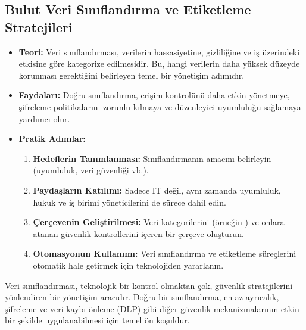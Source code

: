\subsection{Bulut Veri Sınıflandırma ve Etiketleme Stratejileri}
\begin{itemize}
    \item \textbf{Teori:} Veri sınıflandırması, verilerin hassasiyetine, gizliliğine ve iş üzerindeki etkisine göre kategorize edilmesidir. Bu, hangi verilerin daha yüksek düzeyde korunması gerektiğini belirleyen temel bir yönetişim adımıdır.
    \item \textbf{Faydaları:} Doğru sınıflandırma, erişim kontrolünü daha etkin yönetmeye, şifreleme politikalarını zorunlu kılmaya ve düzenleyici uyumluluğu sağlamaya yardımcı olur.
    \item \textbf{Pratik Adımlar:}
    \begin{enumerate}
        \item \textbf{Hedeflerin Tanımlanması:} Sınıflandırmanın amacını belirleyin (uyumluluk, veri güvenliği vb.).
        \item \textbf{Paydaşların Katılımı:} Sadece IT değil, aynı zamanda uyumluluk, hukuk ve iş birimi yöneticilerini de sürece dahil edin.
    \item \textbf{Çerçevenin Geliştirilmesi:} Veri kategorilerini (örneğin ) ve onlara atanan güvenlik kontrollerini içeren bir çerçeve oluşturun.
        \item \textbf{Otomasyonun Kullanımı:} Veri sınıflandırma ve etiketleme süreçlerini otomatik hale getirmek için teknolojiden yararlanın.
    \end{enumerate}
\end{itemize}
Veri sınıflandırması, teknolojik bir kontrol olmaktan çok, güvenlik stratejilerini yönlendiren bir yönetişim aracıdır. Doğru bir sınıflandırma, en az ayrıcalık, şifreleme ve veri kaybı önleme (DLP) gibi diğer güvenlik mekanizmalarının etkin bir şekilde uygulanabilmesi için temel ön koşuldur.

